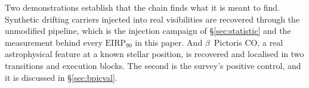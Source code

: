 Two demonstrations establish that the chain finds what it is meant to
find. Synthetic drifting carriers injected into real visibilities are
recovered through the unmodified pipeline, which is the injection
campaign of \S\ref{sec:statistic} and the measurement behind every
$\mathrm{EIRP}_{90}$ in this paper.
And $\beta$~Pictoris CO, a real astrophysical feature at a known stellar
position, is recovered and localised in two transitions and
\NStageOneBpicEb{} execution blocks. The second is the survey's positive
control, and it is discussed in \S\ref{sec:bpicval}.

